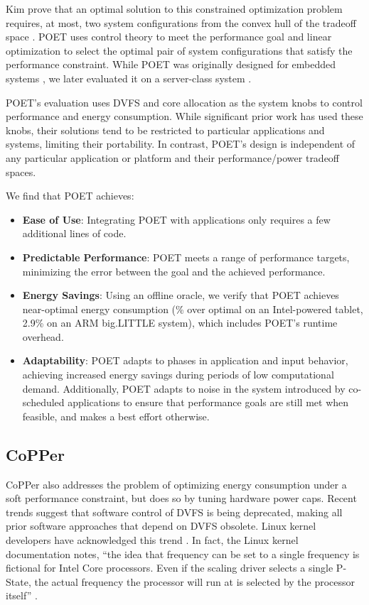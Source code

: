 Kim \etal prove that an optimal solution to this constrained optimization problem requires, at most, two system configurations from the convex hull of the tradeoff space \cite{kim-cpsna2015}.
POET uses control theory to meet the performance goal and linear optimization to select the optimal pair of system configurations that satisfy the performance constraint.
While POET was originally designed for embedded systems \cite{POET}, we later evaluated it on a server-class system \cite{POETMCSoC}.

POET's evaluation uses DVFS and core allocation as the system knobs to control performance and energy consumption.
While significant prior work has used these knobs, their solutions tend to be restricted to particular applications and systems, limiting their portability.
In contrast, POET's design is independent of any particular application or platform and their performance/power tradeoff spaces.

We find that POET achieves:
\begin{itemize}
\item \textbf{Ease of Use}: Integrating POET with applications only requires a few additional lines of code.
\item \textbf{Predictable Performance}: POET meets a range of performance targets, minimizing the error between the goal and the achieved performance.
\item \textbf{Energy Savings}: Using an offline oracle, we verify that POET achieves near-optimal energy consumption (\% over optimal on an Intel-powered tablet, 2.9\% on an ARM big.LITTLE system), which includes POET's runtime overhead.
\item \textbf{Adaptability}: POET adapts to phases in application and input behavior, achieving increased energy savings during periods of low computational demand.
Additionally, POET adapts to noise in the system introduced by co-scheduled applications to ensure that performance goals are still met when feasible, and makes a best effort otherwise.
\end{itemize}


\subsection{CoPPer}

CoPPer also addresses the problem of optimizing energy consumption under a soft performance constraint, but does so by tuning hardware power caps.
Recent trends suggest that software control of DVFS is being deprecated, making all prior software approaches that depend on DVFS obsolete.
Linux kernel developers have acknowledged this trend \cite{lwn602479}.
In fact, the Linux kernel documentation notes, ``the idea that frequency can be set to a single frequency is fictional for Intel Core processors. Even if the scaling driver selects a single P-State, the actual frequency the processor will run at is selected by the processor itself'' \cite{KernelPstate}.

